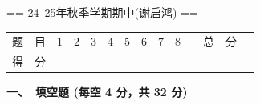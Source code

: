 == 24--25年秋季学期期中(谢启鸿) ==
\begin{center}


    \begin{table}
    \begin{tabular}{|c|c|c|c|}
        题\ \ 目 &\quad$1$\quad&\quad$2$\quad&\quad$3$\quad&\quad$4$\quad&\quad$5$\quad&\quad$6$\quad&\quad$7$\quad&\quad$8$\quad&\ \ 总\ \ 分\ \ \\
        得\ \ 分 & & & & & & & & & 
    \end{tabular}
    \end{table}
\end{center}
\textbf{一、\ 填空题 (每空 4 分，共 32 分)}
